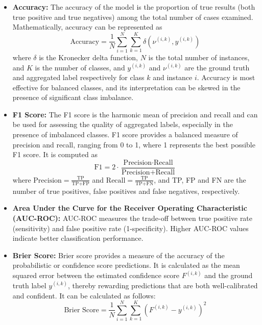 \documentclass[default]{bst/sn-jnl_mine}%
\begin{document}
\begin{itemize}
    \item \textbf{Accuracy:} The accuracy of the model is the proportion of true results (both true positive and true negatives) among the total number of cases examined. Mathematically, accuracy can be represented as
    \begin{equation}
        \text{Accuracy}= \frac{1}{N} \sum_{i=1}^{N} \sum_{k=1}^{K} \delta\left(\nu^{(i,k)}, y^{(i,k)}\right)
    \end{equation}
    where $\delta$ is the Kronecker delta function, $N$ is the total number of instances, and $K$ is the number of classes, and $y^{(i,k)}$ and $\nu^{(i,k)}$ are the ground truth and aggregated label respectively for class $k$ and instance $i$. Accuracy is most effective for balanced classes, and its interpretation can be skewed in the presence of significant class imbalance.
    \item \textbf{F1 Score:} The F1 score is the harmonic mean of precision and recall and can be used for assessing the quality of aggregated labels, especially in the presence of imbalanced classes. F1 score provides a balanced measure of precision and recall, ranging from 0 to 1, where 1 represents the best possible F1 score. It is computed as
    \begin{equation}
        \text{F1} = 2 \cdot \frac{\text{Precision} \cdot \text{Recall}}{\text{Precision} + \text{Recall}}
    \end{equation}
    where $\text{Precision} = \frac{\text{TP}}{\text{TP+FP}}$ and $\text{Recall} = \frac{\text{TP}}{\text{TP+FN}}$, and TP, FP and FN are the number of true positives, false positives and false negatives, respectively.
    \item \textbf{Area Under the Curve for the Receiver Operating Characteristic (AUC-ROC):} AUC-ROC measures the trade-off between true positive rate (sensitivity) and false positive rate (1-specificity). Higher AUC-ROC values indicate better classification performance.
    \item \textbf{Brier Score:} Brier score provides a measure of the accuracy of the probabilistic or confidence score predictions. It is calculated as the mean squared error between the estimated confidence score $F^{(i,k)}$ and the ground truth label $y^{(i,k)}$, thereby rewarding predictions that are both well-calibrated and confident. It can be calculated as follows:
    \begin{equation}
        \text{Brier Score} = \frac{1}{N} \sum_{i=1}^{N} \sum_{k=1}^{K} {\left(F^{(i,k)} - y^{(i,k)}\right)}^2

\end{equation}
\end{itemize}
\end{document}
